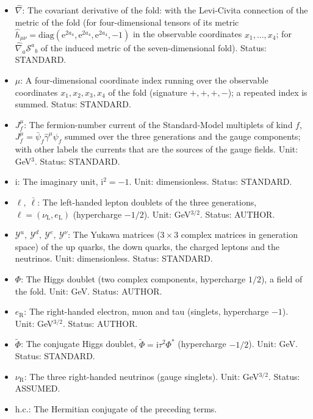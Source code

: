 \documentclass[
  10pt,
]{article}
\providecommand{\tightlist}{%
  \setlength{\itemsep}{0pt}\setlength{\parskip}{0pt}}
\begin{document}
\begin{itemize}
\tightlist
\item
  \(\hat\nabla\): The covariant derivative of the fold: with the
  Levi-Civita connection of the metric of the fold (for four-dimensional
  tensors of its metric
  \(\hat h_{\mu\nu} = \mathrm{diag}(\mathrm{e}^{2a_4}, \mathrm{e}^{2a_4}, \mathrm{e}^{2a_4}, -1)\)
  in the observable coordinates \(x_1, \dots, x_4\); for
  \(\hat\nabla_a\mathcal{S}^a{}_b\) of the induced metric of the
  seven-dimensional fold). Status: STANDARD.
\item
  \(\mu\): A four-dimensional coordinate index running over the
  observable coordinates \(x_1, x_2, x_3, x_4\) of the fold (signature
  \(+,+,+,-\)); a repeated index is summed. Status: STANDARD.
\item
  \(J_f^\mu\): The fermion-number current of the Standard-Model
  multiplets of kind \(f\), \(J_f^\mu = \bar\psi_f\hat\gamma^\mu\psi_f\)
  summed over the three generations and the gauge components; with other
  labels the currents that are the sources of the gauge fields. Unit:
  GeV\(^3\). Status: STANDARD.
\item
  \(\mathrm{i}\): The imaginary unit, \(\mathrm{i}^2 = -1\). Unit:
  dimensionless. Status: STANDARD.
\item
  \(\ell,\ \bar\ell\): The left-handed lepton doublets of the three
  generations, \(\ell = (\nu_{\mathrm{L}}, e_{\mathrm{L}})\)
  (hypercharge \(-1/2\)). Unit: GeV\(^{3/2}\). Status: AUTHOR.
\item
  \(\mathcal{Y}^{u},\ \mathcal{Y}^{d},\ \mathcal{Y}^{e},\ \mathcal{Y}^{\nu}\):
  The Yukawa matrices (\(3 \times 3\) complex matrices in generation
  space) of the up quarks, the down quarks, the charged leptons and the
  neutrinos. Unit: dimensionless. Status: STANDARD.
\item
  \(\Phi\): The Higgs doublet (two complex components, hypercharge
  \(1/2\)), a field of the fold. Unit: GeV. Status: AUTHOR.
\item
  \(e_{\mathrm{R}}\): The right-handed electron, muon and tau (singlets,
  hypercharge \(-1\)). Unit: GeV\(^{3/2}\). Status: AUTHOR.
\item
  \(\tilde\Phi\): The conjugate Higgs doublet,
  \(\tilde\Phi = \mathrm{i}\tau^2\Phi^*\) (hypercharge \(-1/2\)). Unit:
  GeV. Status: STANDARD.
\item
  \(\nu_{\mathrm{R}}\): The three right-handed neutrinos (gauge
  singlets). Unit: GeV\(^{3/2}\). Status: ASSUMED.
\item
  \(\mathrm{h.c.}\): The Hermitian conjugate of the preceding terms.

\end{itemize}
\end{document}
